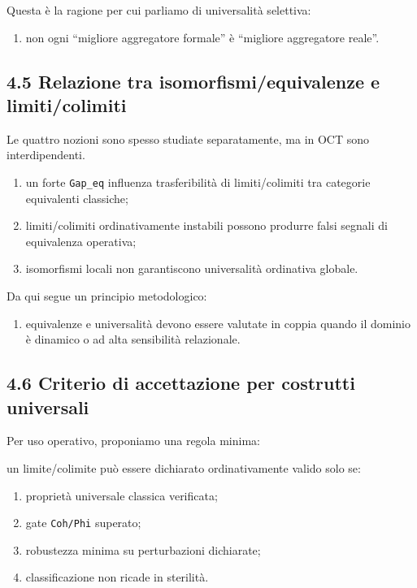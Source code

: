Questa è la ragione per cui parliamo di universalità selettiva:

\begin{enumerate}
\def\labelenumi{\arabic{enumi}.}
\tightlist
\item
  non ogni ``migliore aggregatore formale'' è ``migliore aggregatore reale''.
\end{enumerate}

\subsection{4.5 Relazione tra isomorfismi/equivalenze e limiti/colimiti}

Le quattro nozioni sono spesso studiate separatamente, ma in OCT sono interdipendenti.

\begin{enumerate}
\def\labelenumi{\arabic{enumi}.}
\tightlist
\item
  un forte \texttt{Gap\_eq} influenza trasferibilità di limiti/colimiti tra categorie equivalenti classiche;
\item
  limiti/colimiti ordinativamente instabili possono produrre falsi segnali di equivalenza operativa;
\item
  isomorfismi locali non garantiscono universalità ordinativa globale.
\end{enumerate}

Da qui segue un principio metodologico:

\begin{enumerate}
\def\labelenumi{\arabic{enumi}.}
\tightlist
\item
  equivalenze e universalità devono essere valutate in coppia quando il dominio è dinamico o ad alta sensibilità relazionale.
\end{enumerate}

\subsection{4.6 Criterio di accettazione per costrutti universali}

Per uso operativo, proponiamo una regola minima:

un limite/colimite può essere dichiarato ordinativamente valido solo se:

\begin{enumerate}
\def\labelenumi{\arabic{enumi}.}
\tightlist
\item
  proprietà universale classica verificata;
\item
  gate \texttt{Coh/Phi} superato;
\item
  robustezza minima su perturbazioni dichiarate;
\item
  classificazione non ricade in sterilità.
\end{enumerate}

